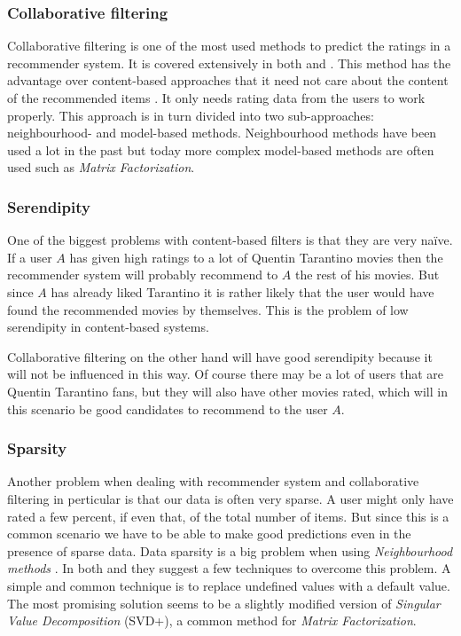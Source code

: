 \documentclass[a4paper,11pt]{article}
\begin{document}
\subsubsection{Collaborative filtering}
Collaborative filtering is one of the most used methods to predict the ratings in
a recommender system. It is covered extensively in both \cite{springerlink:10.1007/978-0-387-85820-3_1} and \cite{1423975}. This method has the advantage over content-based approaches that it need not care about the content of the recommended items \cite{1423975}. It only needs rating data from the users to work properly. This approach is in turn divided into two sub-approaches: neighbourhood- and model-based methods. Neighbourhood methods have been used a lot in the past but today more complex model-based methods are often used such as \emph{Matrix Factorization}.

\subsubsection{Serendipity}
One of the biggest problems with content-based filters is that they are very na\"ive. If a user $A$ has given high ratings to a lot of Quentin Tarantino movies then the recommender system will probably recommend to $A$ the rest of his movies. But since $A$ has already liked Tarantino it is rather likely that the user would have found the recommended movies by themselves. This is the problem of low serendipity in content-based systems.

Collaborative filtering on the other hand will have good serendipity because it will not be influenced in this way. Of course there may be a lot of users that are Quentin Tarantino fans, but they will also have other movies rated, which will in this scenario be good candidates to recommend to the user $A$.

\subsubsection{Sparsity}
Another problem when dealing with recommender system and collaborative filtering in perticular
is that our data is often very sparse\cite{hybridpaper}. A user might only have rated a few percent, 
if even that, of the total number of items. But since this is a common scenario we have to be able to make
good predictions even in the presence of sparse data. Data sparsity is a big problem when using \emph{Neighbourhood methods} \cite{springerlink:10.1007/978-0-387-85820-3_1}. In both \cite{1423975} and \cite{springerlink:10.1007/978-0-387-85820-3_1} they suggest a few techniques to overcome this problem. A simple and common technique is to replace undefined values with a default value. The most promising solution seems to be a slightly modified version of \emph{Singular Value Decomposition} (SVD+), a common method for \emph{Matrix Factorization}.
\end{document}
